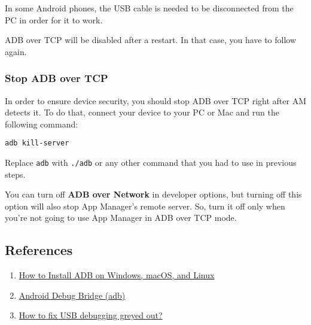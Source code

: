 \begin{tip}[Notice]
    In some Android phones, the USB cable is needed to be disconnected from the PC in order for it to work.
\end{tip}

\begin{warning}[Warning]
    ADB over TCP will be disabled after a restart. In that case, you have to follow
     again.
\end{warning}

\subsubsection{Stop ADB over TCP}\label{subsubsec:stop-adb-over-tcp}
In order to ensure device security, you should stop ADB over TCP right after AM detects it. To do that, connect your device to your PC or Mac and run the following command:
\begin{verbatim}
adb kill-server
\end{verbatim}
Replace \texttt{adb} with \texttt{./adb} or any other command that you had to use in previous steps.

\begin{warning}
    You can turn off \textbf{ADB over Network} in developer options, but turning off this option will also stop App
    Manager's remote server. So, turn it off only when you're not going to use App Manager in ADB over TCP mode.
\end{warning}

\subsection{References}\label{subsec:references}
\begin{enumerate}
    \item \href{https://www.xda-developers.com/install-adb-windows-macos-linux}{How to Install ADB on Windows, macOS, and Linux}
    \item \href{https://developer.android.com/studio/command-line/adb}{Android Debug Bridge (adb)}
    \item \href{https://www.syncios.com/android/fix-usb-debugging-grey-out.html}{How to fix USB debugging greyed out?}
\end{enumerate}
